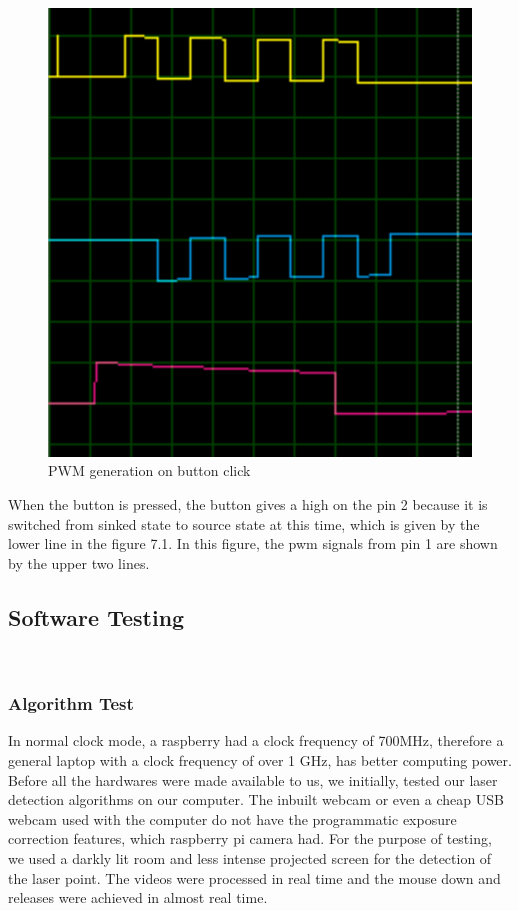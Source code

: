 \documentclass[12pt, a4paper]{article}
\begin{document}
{\begin{figure}[htp]
\centering
\includegraphics[scale=0.30]{afterpress.png}
\caption{PWM generation on button click}
\label{}
\end{figure}

When the button is pressed, the button gives a high on the pin 2 because it is switched from sinked state to source state at this time, which is given by the lower line in the figure 7.1. In this figure, the pwm signals from pin 1 are shown by the upper two lines.

 

\subsection{Software Testing}
~\\
\subsubsection{Algorithm Test}
In normal clock mode, a raspberry had a clock frequency of 700MHz, therefore a general laptop with a clock frequency of over 1 GHz, has better computing power. Before all the hardwares were made available to us, we initially, tested our laser detection algorithms on our computer. The inbuilt webcam or even a cheap USB webcam used with the computer do not have the programmatic exposure correction features, which raspberry pi camera had. For the purpose of testing, we used a darkly lit room and less intense projected screen for the detection of the laser point. The videos were processed in real time and the mouse down and releases were achieved in almost real time. 

}
\end{document}
